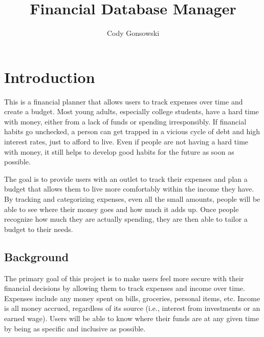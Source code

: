 \documentclass[10pt,conference,onecolumn,compsoc]{IEEEtran}
\begin{document}
\title{Financial Database Manager}

\author{Cody Gonsowski}%



\maketitle


\IEEEdisplaynontitleabstractindextext
\IEEEpeerreviewmaketitle


\section{Introduction}

This is a financial planner that allows users to track expenses over time and create a budget. Most young adults, especially college students, have a hard time with money, either from a lack of funds or spending irresponsibly. If financial habits go unchecked, a person can get trapped in a vicious cycle of debt and high interest rates, just to afford to live. Even if people are not having a hard time with money, it still helps to develop good habits for the future as soon as possible.

The goal is to provide users with an outlet to track their expenses and plan a budget that allows them to live more comfortably within the income they have. By tracking and categorizing expenses, even all the small amounts, people will be able to see where their money goes and how much it adds up. Once people recognize how much they are actually spending, they are then able to tailor a budget to their needs.


\subsection{Background}
The primary goal of this project is to make users feel more secure with their financial decisions by allowing them to track expenses and income over time.  Expenses include any money spent on bills, groceries, personal items, etc. Income is all money accrued, regardless of its source (i.e., interest from investments or an earned wage). Users will be able to know where their funds are at any given time by being as specific and inclusive as possible.
\end{document}
